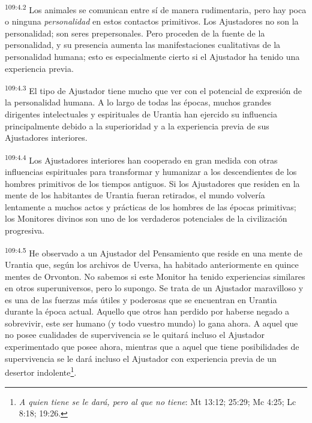 \par
\textsuperscript{109:4.2} Los animales se comunican entre sí de manera rudimentaria, pero hay poca o ninguna \textit{personalidad} en estos contactos primitivos. Los Ajustadores no son la personalidad; son seres prepersonales. Pero proceden de la fuente de la personalidad, y su presencia aumenta las manifestaciones cualitativas de la personalidad humana; esto es especialmente cierto si el Ajustador ha tenido una experiencia previa.

\par
\textsuperscript{109:4.3} El tipo de Ajustador tiene mucho que ver con el potencial de expresión de la personalidad humana. A lo largo de todas las épocas, muchos grandes dirigentes intelectuales y espirituales de Urantia han ejercido su influencia principalmente debido a la superioridad y a la experiencia previa de sus Ajustadores interiores.

\par
\textsuperscript{109:4.4} Los Ajustadores interiores han cooperado en gran medida con otras influencias espirituales para transformar y humanizar a los descendientes de los hombres primitivos de los tiempos antiguos. Si los Ajustadores que residen en la mente de los habitantes de Urantia fueran retirados, el mundo volvería lentamente a muchos actos y prácticas de los hombres de las épocas primitivas; los Monitores divinos son uno de los verdaderos potenciales de la civilización progresiva.

\par
\textsuperscript{109:4.5} He observado a un Ajustador del Pensamiento que reside en una mente de Urantia que, según los archivos de Uversa, ha habitado anteriormente en quince mentes de Orvonton. No sabemos si este Monitor ha tenido experiencias similares en otros superuniversos, pero lo supongo. Se trata de un Ajustador maravilloso y es una de las fuerzas más útiles y poderosas que se encuentran en Urantia durante la época actual. Aquello que otros han perdido por haberse negado a sobrevivir, este ser humano (y todo vuestro mundo) lo gana ahora. A aquel que no posee cualidades de supervivencia se le quitará incluso el Ajustador experimentado que posee ahora, mientras que a aquel que tiene posibilidades de supervivencia se le dará incluso el Ajustador con experiencia previa de un desertor indolente\footnote{\textit{A quien tiene se le dará, pero al que no tiene}: Mt 13:12; 25:29; Mc 4:25; Lc 8:18; 19:26.}.

